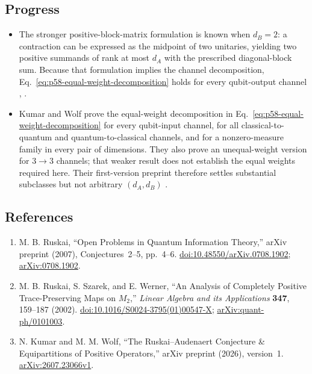 \subsection*{Progress}

\begin{itemize}
  \item The stronger positive-block-matrix formulation is known when
  $d_B=2$: a contraction can be expressed as the midpoint of two unitaries,
  yielding two positive summands of rank at most $d_A$ with the prescribed
  diagonal-block sum.  Because that formulation implies the channel
  decomposition, Eq.~\eqref{eq:p58-equal-weight-decomposition} holds for
  every qubit-output channel
  ,
  .

  \item Kumar and Wolf prove the equal-weight decomposition in
  Eq.~\eqref{eq:p58-equal-weight-decomposition} for every qubit-input
  channel, for all classical-to-quantum and quantum-to-classical channels,
  and for a nonzero-measure family in every pair of dimensions.  They also
  prove an unequal-weight version for $3\to3$ channels; that weaker result
  does not establish the equal weights required here.  Their first-version
  preprint therefore settles substantial subclasses but not arbitrary
  $(d_A,d_B)$ .
\end{itemize}

\subsection*{References}

\begin{enumerate}[label={},leftmargin=4.8em,labelsep=0.5em]
  \footnotesize
  \item[\textup{[Rus07]}]\label{ref:p58-ruskai}
  M. B. Ruskai, ``Open Problems in Quantum Information Theory,''
  arXiv preprint (2007), Conjectures~2--5, pp.~4--6.
  \newline
  \href{https://doi.org/10.48550/arXiv.0708.1902}{doi:10.48550/arXiv.0708.1902};
  \href{https://arxiv.org/abs/0708.1902}{arXiv:0708.1902}.

  \item[\textup{[RSW02]}]\label{ref:p58-ruskai-szarek-werner}
  M. B. Ruskai, S. Szarek, and E. Werner,
  ``An Analysis of Completely Positive Trace-Preserving Maps on $M_2$,''
  \emph{Linear Algebra and its Applications} \textbf{347}, 159--187
  (2002).
  \href{https://doi.org/10.1016/S0024-3795(01)00547-X}{doi:10.1016/S0024-3795(01)00547-X};
  \href{https://arxiv.org/abs/quant-ph/0101003}{arXiv:quant-ph/0101003}.

  \item[\textup{[KW26]}]\label{ref:p58-kumar-wolf}
  N. Kumar and M. M. Wolf,
  ``The Ruskai--Audenaert Conjecture \& Equipartitions of Positive
  Operators,'' arXiv preprint (2026), version~1.
  \href{https://arxiv.org/abs/2607.23066v1}{arXiv:2607.23066v1}.
\end{enumerate}

